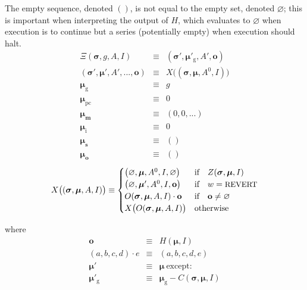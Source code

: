 \documentclass[9pt,oneside]{amsart}
\begin{document}
\begin{multicols}{2}
\hypertarget{empty_sequence_vs_empty_set}{}The empty sequence, denoted $()$, is not equal to the empty set, denoted $\varnothing$; this is important when interpreting the output of $H$, which evaluates to $\varnothing$ when execution is to continue but a series (potentially empty) when execution should halt.
\begin{eqnarray}
\Xi(\boldsymbol{\sigma}, g, A, I) & \equiv & (\boldsymbol{\sigma}'\!, \boldsymbol{\mu}'_{\mathrm{g}}, A', \mathbf{o}) \\
(\boldsymbol{\sigma}', \boldsymbol{\mu}'\!, A', ..., \mathbf{o}) & \equiv & X\big((\boldsymbol{\sigma}, \boldsymbol{\mu}, A^0\!, I)\big) \\
\boldsymbol{\mu}_{\mathrm{g}} & \equiv & g \\
\boldsymbol{\mu}_{\mathrm{pc}} & \equiv & 0 \\
\boldsymbol{\mu}_{\mathbf{m}} & \equiv & (0, 0, ...) \\
\boldsymbol{\mu}_{\mathrm{i}} & \equiv & 0 \\
\boldsymbol{\mu}_{\mathbf{s}} & \equiv & () \\
\boldsymbol{\mu}_{\mathbf{o}} & \equiv & ()
\end{eqnarray}
\begin{equation} \label{eq:X-def}
X\big( (\boldsymbol{\sigma}, \boldsymbol{\mu}, A, I) \big) \equiv \begin{cases}
\big(\varnothing, \boldsymbol{\mu}, A^0, I, \varnothing\big) & \text{if} \quad Z(\boldsymbol{\sigma}, \boldsymbol{\mu}, I) \\
\big(\varnothing, \boldsymbol{\mu}', A^0, I, \mathbf{o}\big) & \text{if} \quad w = \text{\small REVERT} \\
O(\boldsymbol{\sigma}, \boldsymbol{\mu}, A, I) \cdot \mathbf{o} & \text{if} \quad \mathbf{o} \neq \varnothing \\
X\big(O(\boldsymbol{\sigma}, \boldsymbol{\mu}, A, I)\big) & \text{otherwise} \\
\end{cases}
\end{equation}

where
\begin{eqnarray}
\mathbf{o} & \equiv & H(\boldsymbol{\mu}, I) \\
(a, b, c, d) \cdot e & \equiv & (a, b, c, d, e) \\
\boldsymbol{\mu}' & \equiv & \boldsymbol{\mu}\ \text{except:} \\
\boldsymbol{\mu}'_{\mathrm{g}} & \equiv & \boldsymbol{\mu}_{\mathrm{g}} - C(\boldsymbol{\sigma}, \boldsymbol{\mu}, I)
\end{eqnarray}


\end{multicols}
\end{document}
